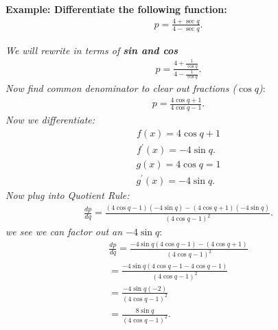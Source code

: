 \documentclass{report}
\begin{document}
  \bigbreak \noindent 
  \begin{mdframed}
    \textbf{Example: Differentiate the following function:}
    \begin{align*}
      p = \frac{4 + \sec{q}}{4 - \sec{q}}
    .\end{align*}
  \end{mdframed}
  \bigbreak \noindent 
  \textit{We will rewrite in terms of \textbf{\textit{sin and cos}}} 
  \begin{align*}
    p = \frac{4 + \frac{1}{ \cos{q}}}{4 - \frac{1}{ \cos{q}}} 
  .\end{align*}
  \bigbreak \noindent 
  \textit{Now find common denominator to clear out fractions ($ \cos{q}$)}:
  \begin{align*}
    p= \frac{4 \cos{q} + 1}{4 \cos{q} - 1} 
  .\end{align*}
  \bigbreak \noindent 
  \textit{Now we differentiate:}
  \begin{align*}
    f(x) = 4 \cos{q} + 1 \\
    f ^{\prime}(x) = -4 \sin{q}
  .\end{align*}
  \begin{align*}
    g(x) = 4 \cos{q} = 1 \\ 
    g ^{\prime}(x) = -4 \sin{q}
  .\end{align*}
  \bigbreak \noindent 
  \textit{Now plug into Quotient Rule:}
  \begin{align*}
    \frac{dp}{dq} = \frac{(4 \cos{q} - 1)(-4 \sin{q}) - (4 \cos{q} + 1)(-4 \sin{q})}{(4 \cos{q}-1)^2 }
  .\end{align*}
  \bigbreak \noindent 
  \textit{we see we can factor out an $-4 \sin{q}$}:
  \begin{align*}
    \frac{dp}{dq} = \frac{-4 \sin{q}(4 \cos{q} -1)-(4 \cos{q} +1)}{(4 \cos{q}-1)^2 } \\ 
    = \frac{-4 \sin{q}(4 \cos{q} -1-4 \cos{q} -1)}{(4 \cos{q}-1)^2 } \\ 
    = \frac{-4 \sin{q}(-2)}{(4 \cos{q}-1)^2 } \\
    = \frac{8 \sin{q}}{(4 \cos{q}-1)^2 }
  .\end{align*}
\end{document}
